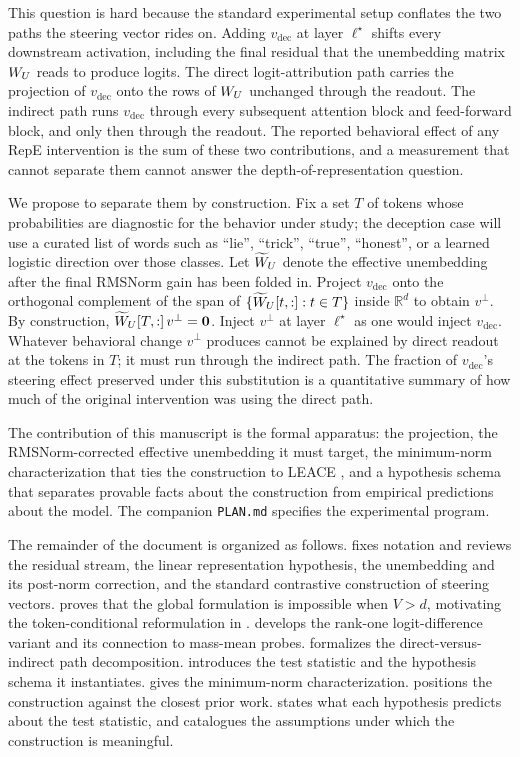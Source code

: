 \documentclass[11pt,letterpaper]{article}
\theoremstyle{plain}
\theoremstyle{definition}
\newcommand{\R}{\mathbb{R}}
\newcommand{\1}{\mathbf{1}}
\newcommand{\zero}{\mathbf{0}}
\newcommand{\WU}{W_{U}\mathchoice{}{}{}{}}
\newcommand{\WUt}{\widetilde{W}_{U}\mathchoice{}{}{}{}}
\newcommand{\vdec}{v_{\text{dec}}}
\newcommand{\vperp}{v^{\perp}}
\begin{document}
This question is hard because the standard experimental setup conflates the two paths the steering vector rides on. Adding $\vdec$ at layer $\ell^\star$ shifts every downstream activation, including the final residual that the unembedding matrix $\WU$ reads to produce logits. The direct logit-attribution path \cite{elhage2021mathematical} carries the projection of $\vdec$ onto the rows of $\WU$ unchanged through the readout. The indirect path runs $\vdec$ through every subsequent attention block and feed-forward block, and only then through the readout. The reported behavioral effect of any RepE intervention is the sum of these two contributions, and a measurement that cannot separate them cannot answer the depth-of-representation question.

We propose to separate them by construction. Fix a set $T$ of tokens whose probabilities are diagnostic for the behavior under study; the deception case will use a curated list of words such as ``lie'', ``trick'', ``true'', ``honest'', or a learned logistic direction over those classes. Let $\WUt$ denote the effective unembedding after the final RMSNorm gain has been folded in. Project $\vdec$ onto the orthogonal complement of the span of $\{\WUt[t,:] : t \in T\}$ inside $\R^d$ to obtain $\vperp$. By construction, $\WUt[T,:]\,\vperp = \zero$. Inject $\vperp$ at layer $\ell^\star$ as one would inject $\vdec$. Whatever behavioral change $\vperp$ produces cannot be explained by direct readout at the tokens in $T$; it must run through the indirect path. The fraction of $\vdec$'s steering effect preserved under this substitution is a quantitative summary of how much of the original intervention was using the direct path.

The contribution of this manuscript is the formal apparatus: the projection, the RMSNorm-corrected effective unembedding it must target, the minimum-norm characterization that ties the construction to LEACE \cite{belrose2023leace}, and a hypothesis schema that separates provable facts about the construction from empirical predictions about the model. The companion \texttt{PLAN.md} specifies the experimental program.

The remainder of the document is organized as follows.  fixes notation and reviews the residual stream, the linear representation hypothesis, the unembedding and its post-norm correction, and the standard contrastive construction of steering vectors.  proves that the global formulation is impossible when $V > d$, motivating the token-conditional reformulation in .  develops the rank-one logit-difference variant and its connection to mass-mean probes.  formalizes the direct-versus-indirect path decomposition.  introduces the test statistic and the hypothesis schema it instantiates.  gives the minimum-norm characterization.  positions the construction against the closest prior work.  states what each hypothesis predicts about the test statistic, and  catalogues the assumptions under which the construction is meaningful.
\end{document}
